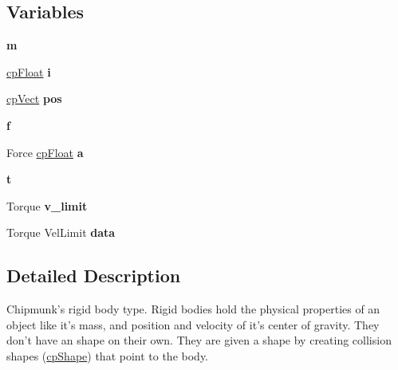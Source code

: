 \subsection*{Variables}
\begin{DoxyCompactItemize}
\item 
\hypertarget{group__cp_body_gab3cd915d758008bd19d0f2428fbb354a}{{\bfseries m}}\label{group__cp_body_gab3cd915d758008bd19d0f2428fbb354a}

\item 
\hypertarget{group__cp_body_gac8936188af0c1d2f8b9d0cd25fde43b2}{\hyperlink{group__basic_types_gac1ed65573e035bf892505768c852d8d3}{cp\-Float} {\bfseries i}}\label{group__cp_body_gac8936188af0c1d2f8b9d0cd25fde43b2}

\item 
\hypertarget{group__cp_body_gac6f6a32d60dacd7e21e11cfe946e2b37}{\hyperlink{structcp_vect}{cp\-Vect} {\bfseries pos}}\label{group__cp_body_gac6f6a32d60dacd7e21e11cfe946e2b37}

\item 
\hypertarget{group__cp_body_ga633de4b0c14ca52ea2432a3c8a5c4c31}{{\bfseries f}}\label{group__cp_body_ga633de4b0c14ca52ea2432a3c8a5c4c31}

\item 
\hypertarget{group__cp_body_ga49306e2f9579c9e38c3ba6624731927a}{Force \hyperlink{group__basic_types_gac1ed65573e035bf892505768c852d8d3}{cp\-Float} {\bfseries a}}\label{group__cp_body_ga49306e2f9579c9e38c3ba6624731927a}

\item 
\hypertarget{group__cp_body_gaaccc9105df5383111407fd5b41255e23}{{\bfseries t}}\label{group__cp_body_gaaccc9105df5383111407fd5b41255e23}

\item 
\hypertarget{group__cp_body_gaf341ccd8029e7ae2c8ee67e57e9582ad}{Torque {\bfseries v\-\_\-limit}}\label{group__cp_body_gaf341ccd8029e7ae2c8ee67e57e9582ad}

\item 
\hypertarget{group__cp_body_gad5671404902c80eea7f71eeb4628d34e}{Torque Vel\-Limit {\bfseries data}}\label{group__cp_body_gad5671404902c80eea7f71eeb4628d34e}

\end{DoxyCompactItemize}


\subsection{Detailed Description}
Chipmunk's rigid body type. Rigid bodies hold the physical properties of an object like it's mass, and position and velocity of it's center of gravity. They don't have an shape on their own. They are given a shape by creating collision shapes (\hyperlink{structcp_shape}{cp\-Shape}) that point to the body. 

